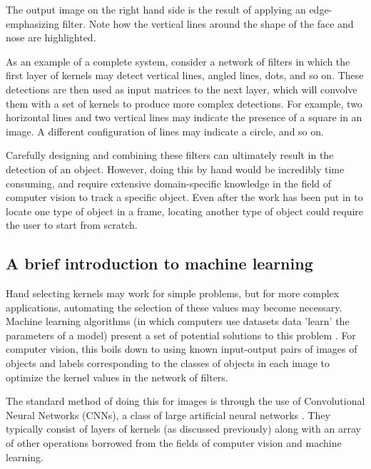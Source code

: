 The output image on the right hand side is the result of applying an edge-emphasizing filter. Note how the vertical lines around the shape of the face and nose are highlighted.

As an example of a complete system, consider a network of filters in which the first layer of kernels may detect vertical lines, angled lines, dots, and so on. These detections are then used as input matrices to the next layer, which will convolve them with a set of kernels to produce more complex detections. For example, two horizontal lines and two vertical lines may indicate the presence of a square in an image. A different configuration of lines may indicate a circle, and so on.

Carefully designing and combining these filters can ultimately result in the detection of an object. However, doing this by hand would be incredibly time consuming, and require extensive domain-specific knowledge in the field of computer vision to track a specific object. Even after the work has been put in to locate one type of object in a frame, locating another type of object could require the user to start from scratch.

\subsection{A brief introduction to machine learning}
Hand selecting kernels may work for simple problems, but for more complex applications, automating the selection of these values may become necessary. Machine learning algorithms (in which computers use datasets data 'learn' the parameters of a model) present a set of potential solutions to this problem \cite{website:cs231n_CNNs}. For computer vision, this boils down to using known input-output pairs of images of objects and labels corresponding to the classes of objects in each image to optimize the kernel values in the network of filters.


The standard method of doing this for images is through the use of Convolutional Neural Networks (CNNs), a class of large artificial neural networks \cite{website:cs231n_CNNs}. They typically consist of layers of kernels (as discussed previously) along with an array of other operations borrowed from the fields of computer vision and machine learning.

